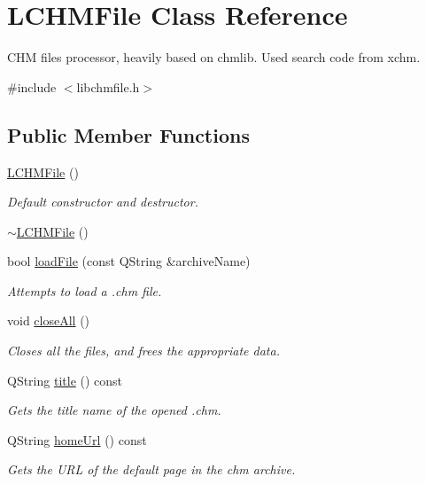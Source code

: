 \hypertarget{classLCHMFile}{\section{L\+C\+H\+M\+File Class Reference}
\label{classLCHMFile}
}


C\+H\+M files processor, heavily based on chmlib. Used search code from xchm.  




{\ttfamily \#include $<$libchmfile.\+h$>$}

\subsection*{Public Member Functions}
\begin{DoxyCompactItemize}
\item 
\hyperlink{classLCHMFile_a5f255d3dfb72ac263aac25c97b08e97d}{L\+C\+H\+M\+File} ()
\begin{DoxyCompactList}\small\item\em Default constructor and destructor. \end{DoxyCompactList}\item 
\hyperlink{classLCHMFile_a2df7b87f3727793bf14d1ce44d11e743}{$\sim$\+L\+C\+H\+M\+File} ()
\item 
bool \hyperlink{classLCHMFile_a99187b66c1ad404bd77382b93c5c4a79}{load\+File} (const Q\+String \&archive\+Name)
\begin{DoxyCompactList}\small\item\em Attempts to load a .chm file. \end{DoxyCompactList}\item 
void \hyperlink{classLCHMFile_aa66c0bdfa729086fb3cdc818606cef0b}{close\+All} ()
\begin{DoxyCompactList}\small\item\em Closes all the files, and frees the appropriate data. \end{DoxyCompactList}\item 
Q\+String \hyperlink{classLCHMFile_ad44b1237596a2844ce743162d0ed7add}{title} () const 
\begin{DoxyCompactList}\small\item\em Gets the title name of the opened .chm. \end{DoxyCompactList}\item 
Q\+String \hyperlink{classLCHMFile_a6d33c304ba1c1e1ba2cbec2c90a5b975}{home\+Url} () const 
\begin{DoxyCompactList}\small\item\em Gets the U\+R\+L of the default page in the chm archive. \end{DoxyCompactList}\item 

\end{DoxyCompactItemize}
